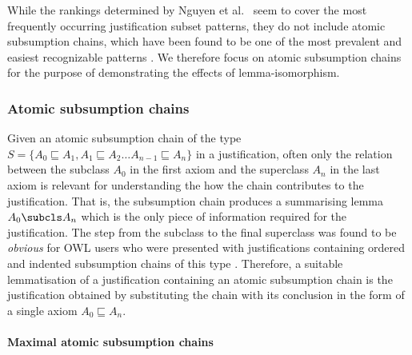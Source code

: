 
While the rankings determined by Nguyen et al.\ \cite{nguyen12ab} seem to cover the most frequently occurring justification subset patterns, they do not include atomic subsumption chains, which have been found to be one of the most prevalent and easiest recognizable patterns \cite{horridge11gj}. We therefore focus on atomic subsumption chains for the purpose of demonstrating the effects of lemma-isomorphism.


\subsubsection{Atomic subsumption chains}
\label{sec:subschains}

Given an atomic subsumption chain of the type $S = \{A_{0}\sqsubseteq A_{1}, A_{1} \sqsubseteq A_{2} \ldots A_{n-1} \sqsubseteq A_{n}\}$ in a justification, often only the relation between the subclass $A_{0}$ in the first axiom and the superclass $A_{n}$ in the last axiom is relevant for understanding the how the chain contributes to the justification. That is, the subsumption chain produces a summarising lemma $A_{0} \subcls A_{n}$ which is the only piece of information required for the justification. The step from the subclass to the final superclass was found to be \emph{obvious} for OWL users who were presented with justifications containing ordered and indented subsumption chains of this type \cite{horridge11gj}. Therefore, a suitable lemmatisation of a justification containing an atomic subsumption chain is the justification obtained by substituting the chain with its conclusion in the form of a single axiom $A_{0} \sqsubseteq A_{n}$.


\paragraph{Maximal atomic subsumption chains}

